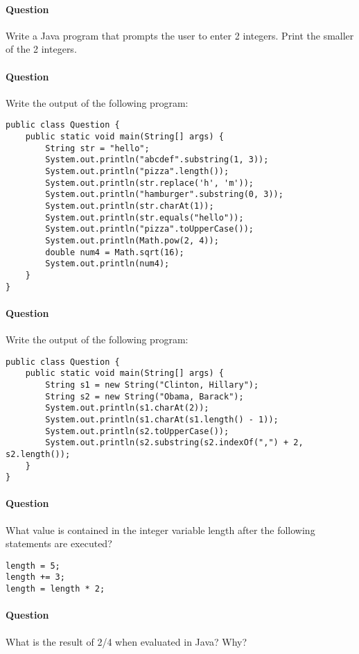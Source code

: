 \documentclass{article}
\begin{document}
\addtocounter{question_num}{1}
\paragraph{Question }
Write a Java program that prompts the user to enter 2 integers. Print the smaller of the 2 integers.

\addtocounter{question_num}{1}
\paragraph{Question }
Write the output of the following program:
\begin{lstlisting}
public class Question {
	public static void main(String[] args) {
		String str = "hello";
		System.out.println("abcdef".substring(1, 3));
		System.out.println("pizza".length());
		System.out.println(str.replace('h', 'm'));
		System.out.println("hamburger".substring(0, 3));
		System.out.println(str.charAt(1));
		System.out.println(str.equals("hello"));
		System.out.println("pizza".toUpperCase());
		System.out.println(Math.pow(2, 4));
		double num4 = Math.sqrt(16);
		System.out.println(num4);
	}
}
\end{lstlisting}

\addtocounter{question_num}{1}
\paragraph{Question }
Write the output of the following program:
\begin{lstlisting}
public class Question {
	public static void main(String[] args) {
		String s1 = new String("Clinton, Hillary");
		String s2 = new String("Obama, Barack");
		System.out.println(s1.charAt(2));
		System.out.println(s1.charAt(s1.length() - 1));
		System.out.println(s2.toUpperCase());
		System.out.println(s2.substring(s2.indexOf(",") + 2, s2.length());
	}
}
\end{lstlisting}

\addtocounter{question_num}{1}
\paragraph{Question }
What value is contained in the integer variable length after the following statements are executed?
\begin{lstlisting}
length = 5;
length += 3;
length = length * 2;
\end{lstlisting}

\addtocounter{question_num}{1}
\paragraph{Question }
What is the result of 2/4 when evaluated in Java? Why?
\end{document}
